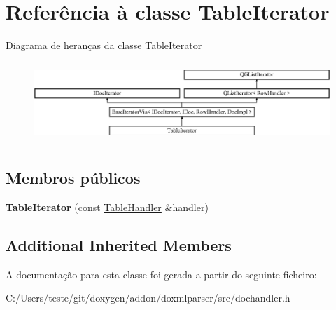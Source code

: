 \hypertarget{class_table_iterator}{\section{Referência à classe Table\-Iterator}
\label{class_table_iterator}
}
Diagrama de heranças da classe Table\-Iterator\begin{figure}[H]
\begin{center}
\leavevmode
\includegraphics[height=3.076923cm]{class_table_iterator}
\end{center}
\end{figure}
\subsection*{Membros públicos}
\begin{DoxyCompactItemize}
\item 
\hypertarget{class_table_iterator_aa50b4f3b0cee197449c64002fb62647e}{{\bfseries Table\-Iterator} (const \hyperlink{class_table_handler}{Table\-Handler} \&handler)}\label{class_table_iterator_aa50b4f3b0cee197449c64002fb62647e}

\end{DoxyCompactItemize}
\subsection*{Additional Inherited Members}


A documentação para esta classe foi gerada a partir do seguinte ficheiro\-:\begin{DoxyCompactItemize}
\item 
C\-:/\-Users/teste/git/doxygen/addon/doxmlparser/src/dochandler.\-h\end{DoxyCompactItemize}
